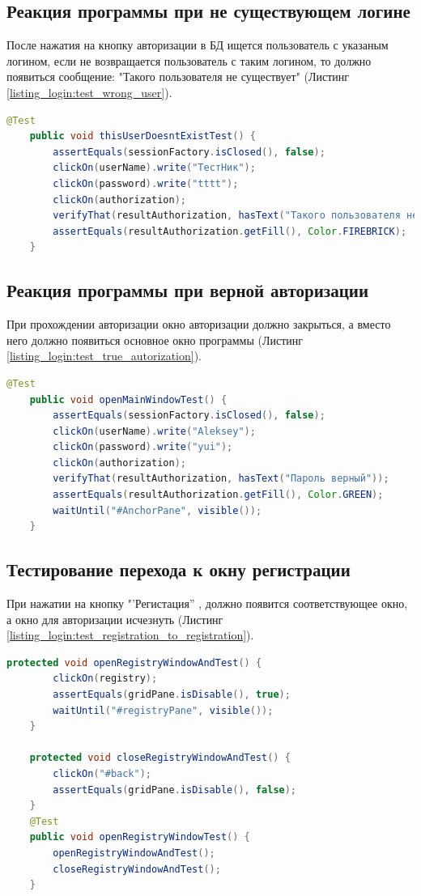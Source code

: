 \documentclass[a4paper,12pt]{article}
\begin{document}
\subsection{Реакция программы при не существующем логине}
После нажатия на кнопку авторизации в БД ищется пользователь с указаным логином, если не возвращается пользователь с таким логином, то должно появиться сообщение: "Такого пользователя не существует" (Листинг \ref{listing_login:test_wrong_user}).
\begin{lstlisting}[language=java, caption=Тестирование при несуществующем логине, label=listing_login:test_wrong_user]
    @Test
    public void thisUserDoesntExistTest() {
        assertEquals(sessionFactory.isClosed(), false);
        clickOn(userName).write("ТестНик");
        clickOn(password).write("tttt");
        clickOn(authorization);
        verifyThat(resultAuthorization, hasText("Такого пользователя не существует"));
        assertEquals(resultAuthorization.getFill(), Color.FIREBRICK);
    }
\end{lstlisting}


\subsection{Реакция программы при верной авторизации}
При прохождении авторизации окно авторизации должно закрыться, а вместо него должно появиться основное окно программы (Листинг \ref{listing_login:test_true_autorization}). 

\begin{lstlisting}[language=java, caption=Тестирование прохождения авторизации, label=listing_login:test_true_autorization]
    @Test
    public void openMainWindowTest() {
        assertEquals(sessionFactory.isClosed(), false);
        clickOn(userName).write("Aleksey");
        clickOn(password).write("yui");
        clickOn(authorization);
        verifyThat(resultAuthorization, hasText("Пароль верный"));
        assertEquals(resultAuthorization.getFill(), Color.GREEN);
        waitUntil("#AnchorPane", visible());
    }
\end{lstlisting}

\subsection{Тестирование перехода к окну регистрации}
При нажатии на кнопку "'Регистация'' , должно появится соответствующее окно, а окно для авторизации исчезнуть (Листинг \ref{listing_login:test_registration_to_registration}). 
\begin{lstlisting}[language=java, caption=Тестирование перехода к окну регистрации, label=listing_login:test_registration_to_registration]
	protected void openRegistryWindowAndTest() {
        clickOn(registry);
        assertEquals(gridPane.isDisable(), true);
        waitUntil("#registryPane", visible());
    }

    protected void closeRegistryWindowAndTest() {
        clickOn("#back");
        assertEquals(gridPane.isDisable(), false);
    }     
    @Test
    public void openRegistryWindowTest() {
        openRegistryWindowAndTest();
        closeRegistryWindowAndTest();
    }
\end{lstlisting}
\end{document}
